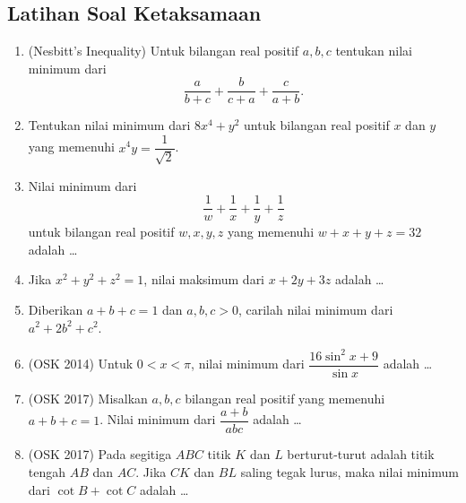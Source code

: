 \subsection{Latihan Soal Ketaksamaan}
\begin{enumerate}
    \item (Nesbitt's Inequality) Untuk bilangan real positif $a,b,c$ tentukan nilai minimum dari $$\dfrac{a}{b+c}+\dfrac{b}{c+a}+\dfrac{c}{a+b}.$$
    
    \item Tentukan nilai minimum dari $8x^4+y^2$ untuk bilangan real positif $x$ dan $y$ yang memenuhi $x^4y=\dfrac{1}{\sqrt{2}}$.
    
    \item Nilai minimum dari $$\dfrac{1}{w}+\dfrac{1}{x}+\dfrac{1}{y}+\dfrac{1}{z}$$
    untuk bilangan real positif $w,x,y,z$ yang memenuhi $w+x+y+z=32$ adalah \dots
    
    \item Jika $x^2+y^2+z^2=1$, nilai maksimum dari $x+2y+3z$ adalah \dots
    
    \item Diberikan $a+b+c=1$ dan $a,b,c>0$, carilah nilai minimum dari $a^2+2b^2+c^2$.
    
    \item (OSK 2014) Untuk $0 < x < \pi$, nilai minimum dari $\dfrac{16 \sin^2 x + 9}{\sin x}$ adalah \dots
    
    \item (OSK 2017) Misalkan $a,b,c$ bilangan real positif yang memenuhi $a+b+c=1$. Nilai minimum dari $\dfrac{a+b}{abc}$ adalah \dots
    
    \item (OSK 2017) Pada segitiga $ABC$ titik $K$ dan $L$ berturut-turut adalah titik tengah $AB$ dan $AC$. Jika $CK$ dan $BL$ saling tegak lurus, maka nilai minimum dari $\cot B + \cot C$ adalah \dots
\end{enumerate}